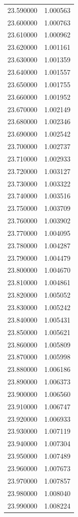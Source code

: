 \begin{tabular}{rr}
23.590000 & 1.000563 \\
23.600000 & 1.000763 \\
23.610000 & 1.000962 \\
23.620000 & 1.001161 \\
23.630000 & 1.001359 \\
23.640000 & 1.001557 \\
23.650000 & 1.001755 \\
23.660000 & 1.001952 \\
23.670000 & 1.002149 \\
23.680000 & 1.002346 \\
23.690000 & 1.002542 \\
23.700000 & 1.002737 \\
23.710000 & 1.002933 \\
23.720000 & 1.003127 \\
23.730000 & 1.003322 \\
23.740000 & 1.003516 \\
23.750000 & 1.003709 \\
23.760000 & 1.003902 \\
23.770000 & 1.004095 \\
23.780000 & 1.004287 \\
23.790000 & 1.004479 \\
23.800000 & 1.004670 \\
23.810000 & 1.004861 \\
23.820000 & 1.005052 \\
23.830000 & 1.005242 \\
23.840000 & 1.005431 \\
23.850000 & 1.005621 \\
23.860000 & 1.005809 \\
23.870000 & 1.005998 \\
23.880000 & 1.006186 \\
23.890000 & 1.006373 \\
23.900000 & 1.006560 \\
23.910000 & 1.006747 \\
23.920000 & 1.006933 \\
23.930000 & 1.007119 \\
23.940000 & 1.007304 \\
23.950000 & 1.007489 \\
23.960000 & 1.007673 \\
23.970000 & 1.007857 \\
23.980000 & 1.008040 \\
23.990000 & 1.008224 \\

\end{tabular}
